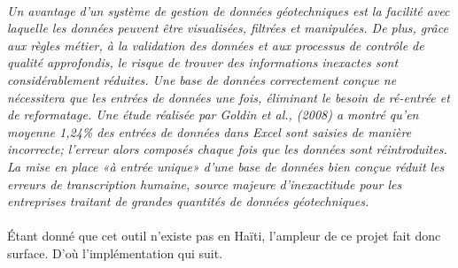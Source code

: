 \paragraph{}
\textit{Un avantage d'un système de gestion de données géotechniques est 
la facilité avec laquelle les données 
peuvent être visualisées, filtrées et manipulées.
De plus, grâce aux règles métier, à la validation des données et aux 
processus de contrôle de qualité approfondis, le risque de trouver
des informations inexactes sont considérablement réduites. Une base de 
données correctement conçue ne nécessitera que les entrées de données
une fois, éliminant le besoin de ré-entrée et de reformatage. Une 
étude réalisée par Goldin et al.,
(2008) a montré qu'en moyenne 1,24\% des entrées de données dans Excel 
sont saisies de manière incorrecte; l'erreur alors
composés chaque fois que les données sont réintroduites. La mise en place 
«à entrée unique» d’une base de données bien conçue réduit les erreurs de 
transcription humaine, source majeure d’inexactitude pour les entreprises
traitant de grandes quantités de données géotechniques.}
\cite{keen2015development}
\paragraph{}
Étant donné que cet outil n'existe pas 
en Haïti, l'ampleur de ce projet fait donc surface.
D'où l'implémentation qui suit.

